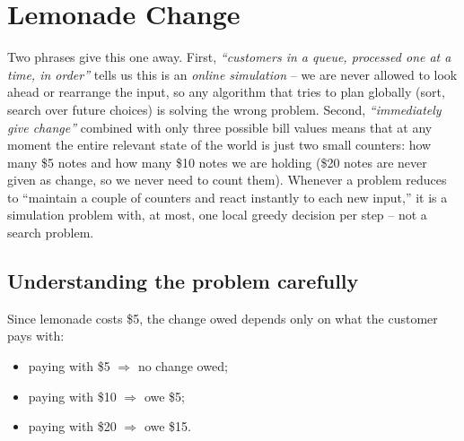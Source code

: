 \section{Lemonade Change}
\label{sec:lemonade-change}


\begin{patternbox}
Two phrases give this one away. First, \emph{``customers in a queue,
processed one at a time, in order''} tells us this is an \emph{online
simulation} -- we are never allowed to look ahead or rearrange the input, so
any algorithm that tries to plan globally (sort, search over future choices)
is solving the wrong problem. Second, \emph{``immediately give change''}
combined with only three possible bill values means that at any moment the
entire relevant state of the world is just two small counters: how many \$5
notes and how many \$10 notes we are holding (\$20 notes are never given as
change, so we never need to count them). Whenever a problem reduces to
``maintain a couple of counters and react instantly to each new input,'' it
is a simulation problem with, at most, one local greedy decision per step --
not a search problem.
\end{patternbox}

\subsection*{Understanding the problem carefully}

Since lemonade costs \$5, the change owed depends only on what the customer
pays with:

\begin{itemize}
  \item paying with \$5 $\Rightarrow$ no change owed;
  \item paying with \$10 $\Rightarrow$ owe \$5;
  \item paying with \$20 $\Rightarrow$ owe \$15.
\end{itemize}

